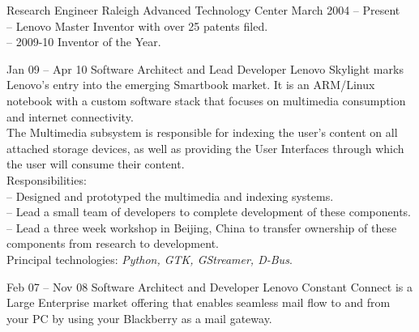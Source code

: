 \documentclass[letterpaper, 11pt]{article}
\begin{document}
    \begin{resume}
        \begin{block}
            \begin{category}{}
                                             {Research Engineer}
                         {Raleigh Advanced Technology Center} {March 2004 -- Present}
                \\[1ex]
                -- Lenovo Master Inventor with over 25 patents filed. \\
                -- 2009-10 Inventor of the Year. \\
            \end{category}
            \begin{subcategory}{Jan 09 -- Apr 10}
                 {Software Architect and Lead Developer}
                Lenovo Skylight marks Lenovo's entry into the emerging Smartbook market.
                It is an ARM/Linux notebook with a custom software stack that focuses
                on multimedia consumption and internet connectivity.
                \\[1ex]
                The Multimedia subsystem is responsible for indexing the user's content on all
                attached storage devices, as well as providing the User Interfaces through which
                the user will consume their content.
                \\[1ex]
                Responsibilities: \\
                -- Designed and prototyped the multimedia and indexing systems. \\
                -- Lead a small team of developers to complete development of these components. \\
                -- Lead a three week workshop in Beijing, China to transfer ownership of these components from research to development.
                \\[1ex]
                Principal technologies: \emph{Python, GTK, GStreamer, D-Bus}.
                \bigskip
            \end{subcategory}
            \begin{subcategory}{Feb 07 -- Nov 08}
                 {Software Architect and Developer}
                Lenovo Constant Connect is a Large Enterprise market offering that enables
                seamless mail flow to and from your PC by using your Blackberry as a mail
                gateway.
                \\[1ex]

\end{subcategory}
\end{block}
\end{resume}
\end{document}
